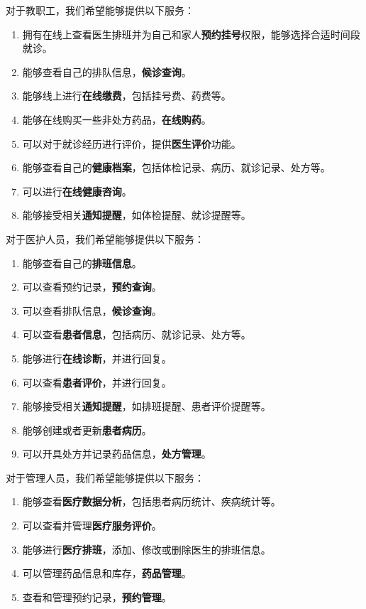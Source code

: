 \documentclass{article}
\begin{document}
\vspace{0.5cm}
对于教职工，我们希望能够提供以下服务：
\begin{enumerate}[itemsep=0.01em]
    \item 拥有在线上查看医生排班并为自己和家人\textbf{预约挂号}权限，能够选择合适时间段就诊。
    \item 能够查看自己的排队信息，\textbf{候诊查询}。
    \item 能够线上进行\textbf{在线缴费}，包括挂号费、药费等。
    \item 能够在线购买一些非处方药品，\textbf{在线购药}。
    \item 可以对于就诊经历进行评价，提供\textbf{医生评价}功能。
    \item 能够查看自己的\textbf{健康档案}，包括体检记录、病历、就诊记录、处方等。
    \item 可以进行\textbf{在线健康咨询}。
    \item 能够接受相关\textbf{通知提醒}，如体检提醒、就诊提醒等。
\end{enumerate}

\vspace{0.5cm}
对于医护人员，我们希望能够提供以下服务：
\begin{enumerate}[itemsep=0.01em]
    \item 能够查看自己的\textbf{排班信息}。
    \item 可以查看预约记录，\textbf{预约查询}。
    \item 可以查看排队信息，\textbf{候诊查询}。
    \item 可以查看\textbf{患者信息}，包括病历、就诊记录、处方等。
    \item 能够进行\textbf{在线诊断}，并进行回复。
    \item 可以查看\textbf{患者评价}，并进行回复。
    \item 能够接受相关\textbf{通知提醒}，如排班提醒、患者评价提醒等。
    \item 能够创建或者更新\textbf{患者病历}。
    \item 可以开具处方并记录药品信息，\textbf{处方管理}。
\end{enumerate}

\vspace{0.5cm}
对于管理人员，我们希望能够提供以下服务：
\begin{enumerate}[itemsep=0.01em]
    \item 能够查看\textbf{医疗数据分析}，包括患者病历统计、疾病统计等。
    \item 可以查看并管理\textbf{医疗服务评价}。
    \item 能够进行\textbf{医疗排班}，添加、修改或删除医生的排班信息。
    \item 可以管理药品信息和库存，\textbf{药品管理}。
    \item 查看和管理预约记录，\textbf{预约管理}。
\end{enumerate}
\end{document}
